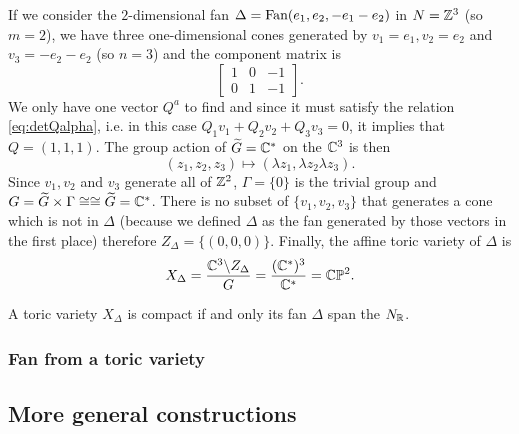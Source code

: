             \begin{examp*}
                If we consider the $2$-dimensional fan $\Delta=\text{Fan}(e_1,e_2,-e_1-e_2)$ in $N=\mathbb{Z}^3$ (so $m=2$), we have three one-dimensional cones generated by $v_1=e_1,v_2=e_2$ and $v_3=-e_2-e_2$ (so $n=3$) and the component matrix is
                \begin{equation}
                    \begin{bmatrix}
                        1 & 0 & -1 \\
                        0 & 1 & -1
                    \end{bmatrix}.
                \end{equation}
                We only have one vector $Q^a$ to find and since it must satisfy the relation \eqref{eq:detQalpha}, i.e. in this case $Q_1v_1+Q_2v_2+Q_3v_3=0$, it implies that $Q=(1,1,1)$. The group action of $\widetilde{G}=\mathbb{C}^*$ on the $\mathbb{C}^3$ is then
                \begin{equation}
                    (z_1,z_2,z_3)\mapsto (\lambda z_1,\lambda z_2\lambda z_3).
                \end{equation}
                Since $v_1,v_2$ and $v_3$ generate all of $\mathbb{Z}^2$, $\Gamma=\{0\}$ is the trivial group and $G=\widetilde{G}\times\Gamma\cong\cong\widetilde{G}=\mathbb{C}^*$. There is no subset of $\{v_1,v_2,v_3\}$ that generates a cone which is not in $\Delta$ (because we defined $\Delta$ as the fan generated by those vectors in the first place) therefore $Z_\Delta=\{(0,0,0)\}$.  Finally, the affine toric variety of $\Delta$ is
                \begin{equation}
                    X_\Delta=\frac{\mathbb{C}^3\backslash Z_\Delta}{G}=\frac{(\mathbb{C}^*)^3}{\mathbb{C}^*}=\mathbb{C}\mathbb{P}^2.
                \end{equation}
            \end{examp*}

            \begin{prop*}
                A toric variety $X_\Delta$ is compact if and only its fan $\Delta$ span the $N_{\mathbb{R}}$.
            \end{prop*}

        \subsubsection{Fan from a toric variety}

        \subsection{More general constructions}

